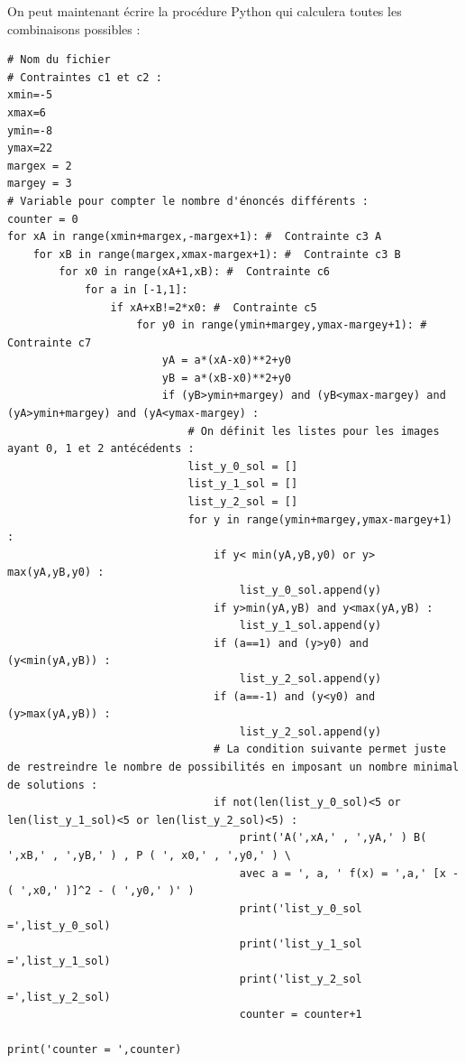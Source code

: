 { 
On peut maintenant écrire la procédure Python qui calculera toutes les combinaisons possibles :
{\small
\begin{verbatim}
# Nom du fichier 
# Contraintes c1 et c2 :
xmin=-5
xmax=6
ymin=-8
ymax=22
margex = 2
margey = 3
# Variable pour compter le nombre d'énoncés différents : 
counter = 0
for xA in range(xmin+margex,-margex+1): #  Contrainte c3 A
    for xB in range(margex,xmax-margex+1): #  Contrainte c3 B 
        for x0 in range(xA+1,xB): #  Contrainte c6
            for a in [-1,1]: 
                if xA+xB!=2*x0: #  Contrainte c5
                    for y0 in range(ymin+margey,ymax-margey+1): #  Contrainte c7
                        yA = a*(xA-x0)**2+y0
                        yB = a*(xB-x0)**2+y0
                        if (yB>ymin+margey) and (yB<ymax-margey) and (yA>ymin+margey) and (yA<ymax-margey) :  
                            # On définit les listes pour les images ayant 0, 1 et 2 antécédents : 
                            list_y_0_sol = []
                            list_y_1_sol = []
                            list_y_2_sol = []
                            for y in range(ymin+margey,ymax-margey+1) : 
                                if y< min(yA,yB,y0) or y> max(yA,yB,y0) :
                                    list_y_0_sol.append(y)
                                if y>min(yA,yB) and y<max(yA,yB) :
                                    list_y_1_sol.append(y)
                                if (a==1) and (y>y0) and (y<min(yA,yB)) : 
                                    list_y_2_sol.append(y)
                                if (a==-1) and (y<y0) and (y>max(yA,yB)) : 
                                    list_y_2_sol.append(y) 
                                # La condition suivante permet juste de restreindre le nombre de possibilités en imposant un nombre minimal de solutions : 
                                if not(len(list_y_0_sol)<5 or len(list_y_1_sol)<5 or len(list_y_2_sol)<5) : 
                                    print('A(',xA,' , ',yA,' ) B( ',xB,' , ',yB,' ) , P ( ', x0,' , ',y0,' ) \
                                    avec a = ', a, ' f(x) = ',a,' [x - ( ',x0,' )]^2 - ( ',y0,' )' )
                                    print('list_y_0_sol =',list_y_0_sol)
                                    print('list_y_1_sol =',list_y_1_sol)
                                    print('list_y_2_sol =',list_y_2_sol)
                                    counter = counter+1
                                    
print('counter = ',counter)
\end{verbatim}
}

}
